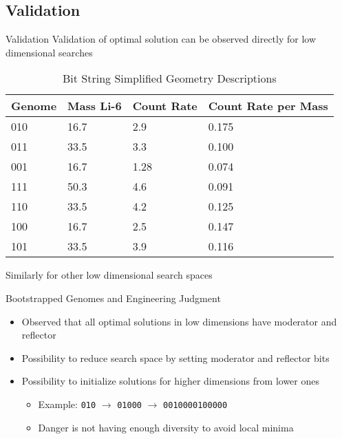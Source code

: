 \subsection{Validation}
\begin{frame}{Validation}
Validation of optimal solution can be observed directly for low dimensional searches
\begin{table}
    \caption[3 Bit Genome Results]{Bit String Simplified Geometry Descriptions}
    \label{tab:BitStringGeo}
    \centering
    \tiny
    \begin{tabular}{ p{1.5cm} | p{1.5cm} p{1.5cm}  p{1.5cm}}
			Genome&Mass Li-6&Count Rate& Count Rate per Mass \\
      \hline
      \hline
			010&16.7&2.9&0.175 \\ 
			\hline
			011&33.5&3.3&0.100 \\
			001&16.7&1.28&0.074 \\
			111&50.3&4.6&0.091 \\
			110&33.5&4.2&0.125 \\ 
			100&16.7&2.5&0.147 \\
			101&33.5&3.9&0.116 \\
      \hline
    \end{tabular}
\end{table}
Similarly for other low dimensional search spaces
\end{frame}

\begin{frame}[fragile]{Bootstrapped Genomes and Engineering Judgment}
\begin{itemize}
	\item Observed that all optimal solutions in low dimensions have moderator and reflector
	\item Possibility to reduce search space by setting moderator and reflector bits
	\item Possibility to initialize solutions for higher dimensions from lower ones
	\begin{itemize}
		\item Example: \verb+010+ $\to$ \verb+01000+ $\to$ \verb+0010000100000+
		\item Danger is not having enough diversity to avoid local minima
	\end{itemize}
\end{itemize}
\end{frame}

